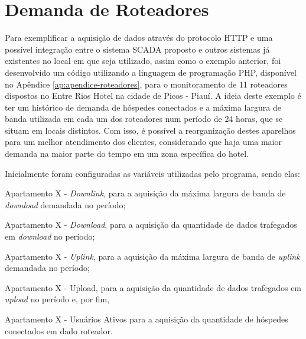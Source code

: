     	\begin{figure}[!h]
    	\end{figure}

\quad

\section{Demanda de Roteadores}
\label{sec:demanda-roteadores}
Para exemplificar a aquisição de dados através do protocolo \gls{HTTP} e uma possível integração entre o sistema \gls{SCADA} proposto e outros sistemas já existentes no local em que seja utilizado, assim como o exemplo anterior, foi desenvolvido um código utilizando a linguagem de programação PHP, disponível no Apêndice \ref{ap:apendice-roteadores}, para o monitoramento de 11 roteadores dispostos no Entre Rios Hotel na cidade de Picos - Piauí. A ideia deste exemplo é ter um histórico de demanda de hóspedes conectados e a máxima largura de banda utilizada em cada um dos roteadores num período de 24 horas, que se situam em locais distintos. Com isso, é possível a reorganização destes aparelhos para um melhor atendimento dos clientes, considerando que haja uma maior demanda na maior parte do tempo em um zona específica do hotel.

Inicialmente foram configuradas as variáveis utilizadas pelo programa, sendo elas:

\begin{alineascomponto}
    \item Apartamento X - \textit{Downlink}, para a aquisição da máxima largura de banda de \textit{download} demandada no período;
    \item Apartamento X - \textit{Download}, para a aquisição da quantidade de dados trafegados em \textit{download} no período;
    \item Apartamento X - \textit{Uplink}, para a aquisição da máxima largura de banda de \textit{uplink} demandada no período;
    \item Apartamento X - Upload, para a aquisição da quantidade de dados trafegados em \textit{upload} no período e, por fim,
    \item Apartamento X - Usuários Ativos para a aquisição da quantidade de hóspedes conectados em dado roteador.
\end{alineascomponto}

